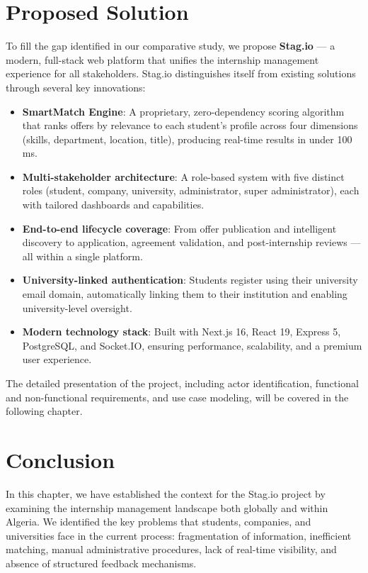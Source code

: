 \section{Proposed Solution}

To fill the gap identified in our comparative study, we propose \textbf{Stag.io} --- a modern, full-stack web platform that unifies the internship management experience for all stakeholders. Stag.io distinguishes itself from existing solutions through several key innovations:

\begin{itemize}
    \item \textbf{SmartMatch Engine}: A proprietary, zero-dependency scoring algorithm that ranks offers by relevance to each student's profile across four dimensions (skills, department, location, title), producing real-time results in under 100\,ms.
    \item \textbf{Multi-stakeholder architecture}: A role-based system with five distinct roles (student, company, university, administrator, super administrator), each with tailored dashboards and capabilities.
    \item \textbf{End-to-end lifecycle coverage}: From offer publication and intelligent discovery to application, agreement validation, and post-internship reviews --- all within a single platform.
    \item \textbf{University-linked authentication}: Students register using their university email domain, automatically linking them to their institution and enabling university-level oversight.
    \item \textbf{Modern technology stack}: Built with Next.js 16, React 19, Express 5, PostgreSQL, and Socket.IO, ensuring performance, scalability, and a premium user experience.
\end{itemize}

The detailed presentation of the project, including actor identification, functional and non-functional requirements, and use case modeling, will be covered in the following chapter.

\section{Conclusion}

In this chapter, we have established the context for the Stag.io project by examining the internship management landscape both globally and within Algeria. We identified the key problems that students, companies, and universities face in the current process: fragmentation of information, inefficient matching, manual administrative procedures, lack of real-time visibility, and absence of structured feedback mechanisms.

